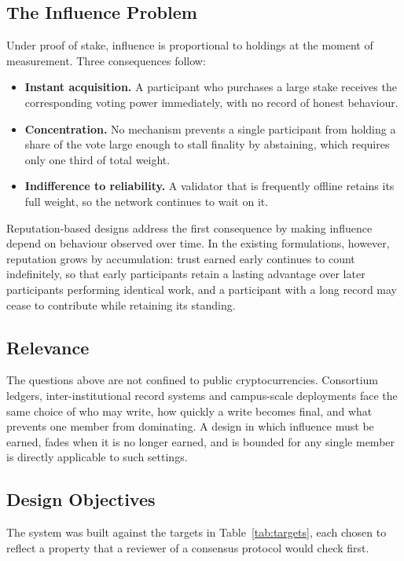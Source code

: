 \documentclass[conference]{IEEEtran}
\begin{document}
\subsection{The Influence Problem}
Under proof of stake, influence is proportional to holdings at the moment of measurement. Three consequences follow:
\begin{itemize}
\item \textbf{Instant acquisition.} A participant who purchases a large stake receives the corresponding voting power immediately, with no record of honest behaviour.
\item \textbf{Concentration.} No mechanism prevents a single participant from holding a share of the vote large enough to stall finality by abstaining, which requires only one third of total weight.
\item \textbf{Indifference to reliability.} A validator that is frequently offline retains its full weight, so the network continues to wait on it.
\end{itemize}
Reputation-based designs \cite{yu2019,aluko2021} address the first consequence by making influence depend on behaviour observed over time. In the existing formulations, however, reputation grows by accumulation: trust earned early continues to count indefinitely, so that early participants retain a lasting advantage over later participants performing identical work, and a participant with a long record may cease to contribute while retaining its standing.

\subsection{Relevance}
The questions above are not confined to public cryptocurrencies. Consortium ledgers, inter-institutional record systems and campus-scale deployments face the same choice of who may write, how quickly a write becomes final, and what prevents one member from dominating. A design in which influence must be earned, fades when it is no longer earned, and is bounded for any single member is directly applicable to such settings.

\subsection{Design Objectives}
The system was built against the targets in Table~\ref{tab:targets}, each chosen to reflect a property that a reviewer of a consensus protocol would check first.
\end{document}
